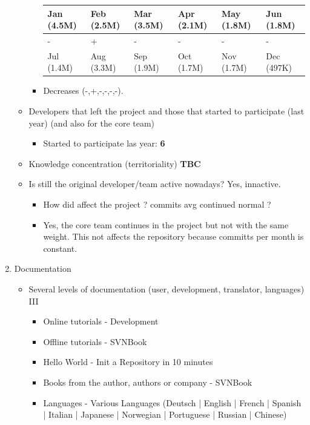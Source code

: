 \documentclass[11pt]{scrartcl}
\begin{document}
\begin{enumerate}
\begin{itemize}
\begin{itemize}
                \begin{tabular}{|l|l|l|l|l|l|}
                    \hline
            	    Jan (4.5M) & Feb (2.5M) & Mar (3.5M) & Apr (2.1M) & May (1.8M) & Jun (1.8M)\\
            	    \hline
            	    - & + & - & - & - & -\\
                    \hline
                    Jul (1.4M) & Aug (3.3M) & Sep (1.9M) & Oct (1.7M) & Nov (1.7M) & Dec (497K)\\
                    \hline
                \end{tabular}
            \item Decreases (-,+,-,-,-,-).
        \end{itemize}
	    \item Developers that left the project and those that started to participate (last year) (and also for the core team)
	    \begin{itemize}
            \item Started to participate las year: \textbf{6}
        \end{itemize}
	    \item Knowledge concentration (territoriality) \textbf{TBC}
	    \item Is still the original developer/team active nowadays? Yes, innactive.
	    \begin{itemize}
            \item How did affect the project ? commits avg continued normal ?
            \item Yes, the core team continues in the project but not with the same weight. This not affects the repository because committs per month is constant.
        \end{itemize}
    \end{itemize}

    \item Documentation
    \begin{itemize}
 	    \item Several levels of documentation (user, development, translator, languages) III
     	    \begin{itemize}
                \item Online tutorials - Development
                \item Offline tutorials - SVNBook
                \item Hello World - Init a Repository in 10 minutes
                \item Books from the author, authors or company - SVNBook
                \item Languages - Various Languages (Deutsch | English | French | Spanish | Italian | Japanese | Norwegian | Portuguese | Russian | Chinese)
            \end{itemize}
    \end{itemize}

\end{enumerate}
\end{document}
